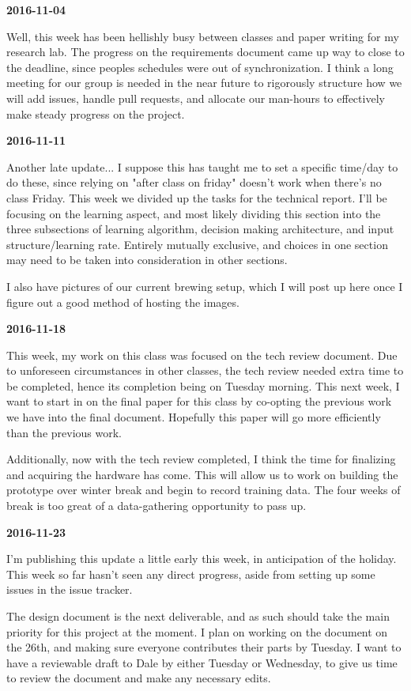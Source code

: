 \textbf{2016-11-04} 

Well, this week has been hellishly busy between classes and paper writing for my research lab.
The progress on the requirements document came up way to close to the deadline, since peoples schedules were out of synchronization.
I think a long meeting for our group is needed in the near future to rigorously structure how we will add issues, handle pull requests, and allocate our man-hours to effectively make steady progress on the project. 

\textbf{2016-11-11} 

Another late update...
I suppose this has taught me to set a specific time/day to do these, since relying on "after class on friday" doesn't work when there's no class Friday.
This week we divided up the tasks for the technical report. I'll be focusing on the learning aspect, and most likely dividing this section into the three subsections of learning algorithm, decision making architecture, and input structure/learning rate.
Entirely mutually exclusive, and choices in one section may need to be taken into consideration in other sections.

I also have pictures of our current brewing setup, which I will post up here once I figure out a good method of hosting the images.

\textbf{2016-11-18} 

This week, my work on this class was focused on the tech review document. Due to unforeseen circumstances in other classes, the tech review needed extra time to be completed, hence its completion being on Tuesday morning. 
This next week, I want to start in on the final paper for this class by co-opting the previous work we have into the final document. 
Hopefully this paper will go more efficiently than the previous work.

Additionally, now with the tech review completed, I think the time for finalizing and acquiring the hardware has come. This will allow us to work on building the prototype over winter break and begin to record training data. The four weeks of break is too great of a data-gathering opportunity to pass up.

\textbf{2016-11-23} 

I'm publishing this update a little early this week, in anticipation of the holiday.
This week so far hasn't seen any direct progress, aside from setting up some issues in the issue tracker.

The design document is the next deliverable, and as such should take the main priority for this project at the moment.
I plan on working on the document on the 26th, and making sure everyone contributes their parts by Tuesday. I want to have a reviewable draft to Dale by either Tuesday or Wednesday, to give us time to review the document and make any necessary edits.

